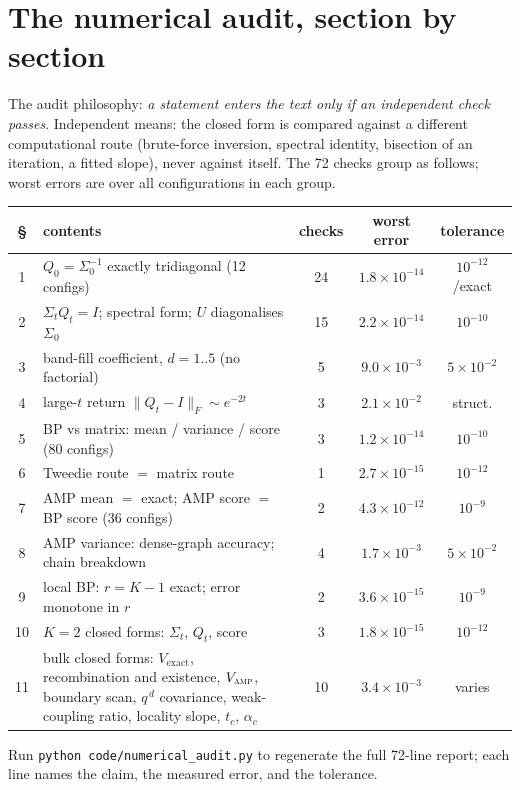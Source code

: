 \documentclass[11pt]{article}
\theoremstyle{definition}
\newcommand{\Sig}{\Sigma}
\newcommand{\Qt}{Q_t}
\begin{document}
\appendix
\section{The numerical audit, section by section}\label{app:audit}

The audit philosophy: \emph{a statement enters the text only if an independent
check passes}. Independent means: the closed form is compared against a
different computational route (brute-force inversion, spectral identity,
bisection of an iteration, a fitted slope), never against itself. The 72
checks group as follows; worst errors are over all configurations in each
group.

\begin{center}\small
\begin{tabular}{@{}cp{}ccc@{}}
\toprule
\S & contents & checks & worst error & tolerance\\
\midrule
1 & $Q_0=\Sig_0^{-1}$ exactly tridiagonal (12 configs) & 24 & $1.8\times10^{-14}$ & $10^{-12}$/exact\\
2 & $\Sig_t\Qt=I$; spectral form; $U$ diagonalises $\Sig_0$ & 15 & $2.2\times10^{-14}$ & $10^{-10}$\\
3 & band-fill coefficient, $d=1..5$ (no factorial) & 5 & $9.0\times10^{-3}$ & $5\times10^{-2}$\\
4 & large-$t$ return $\|\Qt-I\|_F\sim e^{-2t}$ & 3 & $2.1\times10^{-2}$ & struct.\\
5 & BP vs matrix: mean / variance / score (80 configs) & 3 & $1.2\times10^{-14}$ & $10^{-10}$\\
6 & Tweedie route $=$ matrix route & 1 & $2.7\times10^{-15}$ & $10^{-12}$\\
7 & AMP mean $=$ exact; AMP score $=$ BP score (36 configs) & 2 & $4.3\times10^{-12}$ & $10^{-9}$\\
8 & AMP variance: dense-graph accuracy; chain breakdown & 4 & $1.7\times10^{-3}$ & $5\times10^{-2}$\\
9 & local BP: $r{=}K{-}1$ exact; error monotone in $r$ & 2 & $3.6\times10^{-15}$ & $10^{-9}$\\
10 & $K=2$ closed forms: $\Sig_t$, $\Qt$, score & 3 & $1.8\times10^{-15}$ & $10^{-12}$\\
11 & bulk closed forms: $V_{\mathrm{exact}}$, recombination and existence,
     $V_{\textsc{amp}}$, boundary scan, $q^{\,d}$ covariance, weak-coupling
     ratio, locality slope, $t_c$, $\alpha_c$ & 10 & $3.4\times10^{-3}$ & varies\\
\bottomrule
\end{tabular}
\end{center}

\noindent Run \texttt{python code/numerical\_audit.py} to regenerate the full
72-line report; each line names the claim, the measured error, and the
tolerance.



\end{document}

